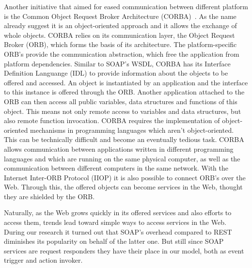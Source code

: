 Another initiative that aimed for eased communication between different platform is the Common Object Request Broker Architecture (CORBA)~\cite{dec1991common}.
As the name already suggest it is an object-oriented approach and it allows the exchange of whole objects.
CORBA relies on its communication layer, the Object Request Broker (ORB), which forms the basis of its architecture.
The platform-specific ORB's provide the communication abstraction, which free the application from platform dependencies.
Similar to SOAP's WSDL, CORBA has its Interface Definition Languange (IDL) to provide information about the objects to be offered and accessed.
An object is instantiated by an application and the interface to this instance is offered through the ORB.
Another application attached to the ORB can then access all public variables, data structures and functions of this object.
This means not only remote access to variables and data structures, but also remote function invocation.
CORBA requires the implementation of object-oriented mechanisms in programming languages which aren't object-oriented.
This can be technically difficult and become an eventually tedious task.
CORBA allows communication between applications written in different programming languages and which are running on the same physical computer, as well as the communication between different computers in the same network.
With the Internet Inter-ORB Protocol (IIOP) it is also possible to connect ORB's over the Web.
Through this, the offered objects can become services in the Web, thought they are shielded by the ORB.



Naturally, as the Web grows quickly in its offered services and also efforts to access them, trends lead toward simple ways to access services in the Web.
During our research it turned out that SOAP's overhead compared to REST diminishes its popularity on behalf of the latter one.
But still since SOAP services are request responders they have their place in our model, both as event trigger and action invoker.


